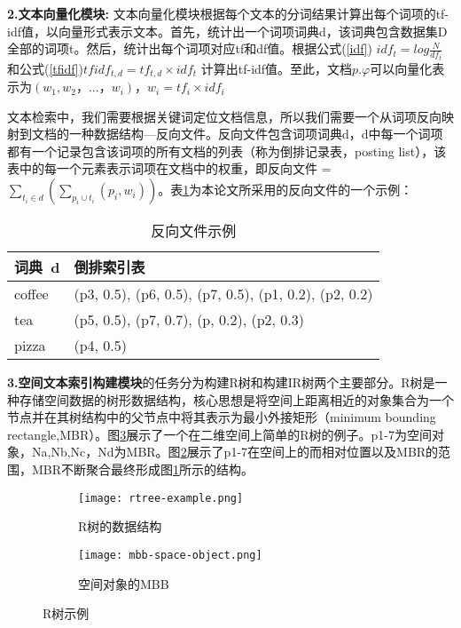 \textbf{2.文本向量化模块:} 文本向量化模块根据每个文本的分词结果计算出每个词项的tf-idf值，以向量形式表示文本。首先，统计出一个词项词典d，该词典包含数据集D全部的词项t。然后，统计出每个词项对应tf和df值。根据公式(\ref{idf}) $idf_{t} = log\frac{N}{df_{t}}$和公式(\ref{tfidf})$tfidf_{t,d} = tf_{t,d} \times idf_{t}$ 计算出tf-idf值。至此，文档$p.\varphi$可以向量化表示为$(w_1, w_2，...，w_i)，w_i=tf_i×idf_i$

文本检索中，我们需要根据关键词定位文档信息，所以我们需要一个从词项反向映射到文档的一种数据结构—反向文件。反向文件包含词项词典d，d中每一个词项都有一个记录包含该词项的所有文档的列表（称为倒排记录表，posting list），该表中的每一个元素表示词项在文档中的权重，即反向文件 = $\sum_{t_i \in d}(\sum_{p_i \cup t_i}(p_i,w_i))$。表\ref{reverse_file}为本论文所采用的反向文件的一个示例：

\begin{table}[h!]
  \begin{center}
    \caption{反向文件示例}
    \label{reverse_file}
    \begin{tabular}{l|l} %
      \textbf{词典\ d} & \textbf{倒排索引表} \\
			\hline
			coffee & (p3, 0.5), (p6, 0.5), (p7, 0.5), (p1, 0.2), (p2, 0.2) \\
      tea & (p5, 0.5), (p7, 0.7), (p, 0.2), (p2, 0.3) \\
      pizza & (p4, 0.5)
    \end{tabular}
  \end{center}
\end{table}

\textbf{3.空间文本索引构建模块}的任务分为构建R树和构建IR树两个主要部分。R树是一种存储空间数据的树形数据结构，核心思想是将空间上距离相近的对象集合为一个节点并在其树结构中的父节点中将其表示为最小外接矩形（minimum bounding rectangle,MBR）。图\ref{rtree:example}展示了一个在二维空间上简单的R树的例子。p1-7为空间对象，Na,Nb,Nc，Nd为MBR。图\ref{rtree:mmb}展示了p1-7在空间上的而相对位置以及MBR的范围，MBR不断聚合最终形成图\ref{rtree:structure}所示的结构。 

\begin{figure}[htbp]
	\centering
	\begin{subfigure}{.5\textwidth}
		\centering
		\texttt{[image: rtree-example.png]}
		\caption{R树的数据结构}
		\label{rtree:structure}
	\end{subfigure}%
	\begin{subfigure}{.5\textwidth}
		\centering
		\texttt{[image: mbb-space-object.png]}
		\caption{空间对象的MBB}
		\label{rtree:mmb}
	\end{subfigure}
	\caption{R树示例}
	\label{rtree:example}
\end{figure}

